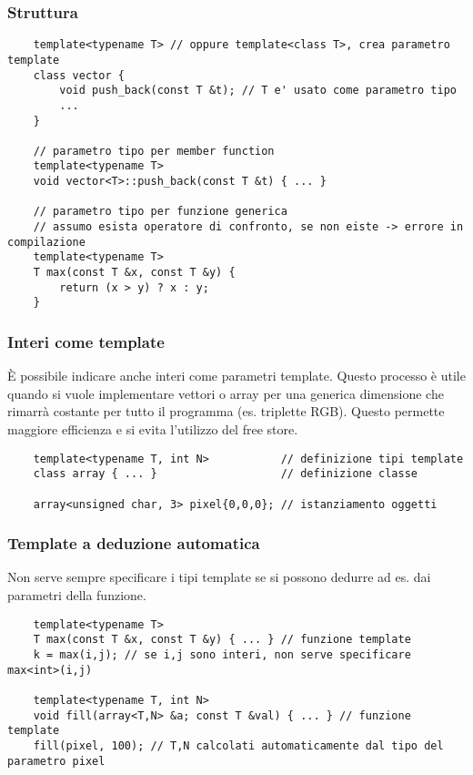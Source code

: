 \documentclass[a4paper]{article}
\begin{document}
\subsubsection*{Struttura}
\begin{lstlisting}
	template<typename T> // oppure template<class T>, crea parametro template
	class vector {
		void push_back(const T &t); // T e' usato come parametro tipo
		...
	}

	// parametro tipo per member function
	template<typename T>
	void vector<T>::push_back(const T &t) { ... }

	// parametro tipo per funzione generica
	// assumo esista operatore di confronto, se non eiste -> errore in compilazione
	template<typename T>
	T max(const T &x, const T &y) {
		return (x > y) ? x : y;
	}
\end{lstlisting}

\subsubsection*{Interi come template}
È possibile indicare anche interi come parametri template. Questo processo è utile quando si vuole implementare vettori o array
per una generica dimensione che rimarrà costante per tutto il programma (es. triplette RGB). Questo permette maggiore efficienza
e si evita l'utilizzo del free store.
\begin{lstlisting}
	template<typename T, int N>           // definizione tipi template
	class array { ... }	                  // definizione classe

	array<unsigned char, 3> pixel{0,0,0}; // istanziamento oggetti
\end{lstlisting}

\subsubsection*{Template a deduzione automatica}
Non serve sempre specificare i tipi template se si possono dedurre ad es. dai parametri della funzione.
\begin{lstlisting}
	template<typename T>
	T max(const T &x, const T &y) { ... } // funzione template
	k = max(i,j); // se i,j sono interi, non serve specificare max<int>(i,j)
	
	template<typename T, int N>
	void fill(array<T,N> &a; const T &val) { ... } // funzione template
	fill(pixel, 100); // T,N calcolati automaticamente dal tipo del parametro pixel
\end{lstlisting}
\end{document}
